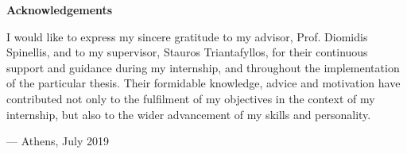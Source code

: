 \begin{center}
\textbf{\large Acknowledgements}
\end{center}

I would like to express my sincere gratitude
to my advisor, Prof. Diomidis Spinellis,
and to my supervisor, Stauros Triantafyllos,
for their continuous support and guidance
during my internship,
and throughout the implementation
of the particular thesis.
Their formidable knowledge, advice and motivation
have contributed not only to the fulfilment
of my objectives in the context of my internship,
but also to the wider advancement of my skills and personality.

\vspace{1cm}

\hfill --- Athens, July 2019
